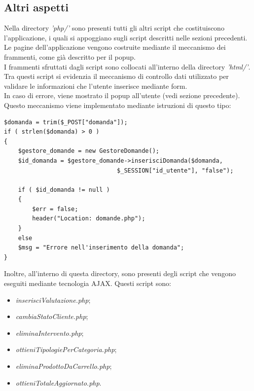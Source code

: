 \documentclass[a4paper, 14pt]{article}
\begin{document}
\begin{flushleft}
		\subsection{Altri aspetti}
			Nella directory \textit{'php/'} sono presenti tutti gli altri script che costituiscono l'applicazione,
			i quali si appoggiano sugli script descritti nelle sezioni precedenti. \\
			Le pagine dell'applicazione vengono costruite mediante il meccanismo dei frammenti, come già descritto per il popup.\\
			I frammenti sfruttati dagli script sono collocati all'interno della directory \textit{'html/'}.
			Tra questi script si evidenzia il meccanismo di controllo dati utilizzato per validare le informazioni
			che l'utente inserisce mediante form. \\
			In caso di errore, viene mostrato il popup all'utente (vedi sezione precedente).\\
			Questo meccanismo viene implementato mediante istruzioni di questo tipo: \newpage
			\begin{lstlisting}[backgroundcolor=\color{coloreSfondoGrammatiche}]
$domanda = trim($_POST["domanda"]);
if ( strlen($domanda) > 0 )
{
	$gestore_domande = new GestoreDomande();
	$id_domanda = $gestore_domande->inserisciDomanda($domanda, 
								$_SESSION["id_utente"], "false");
	
	if ( $id_domanda != null )
	{
		$err = false;
		header("Location: domande.php");
	}
	else
	$msg = "Errore nell'inserimento della domanda";
}
			\end{lstlisting}
			\medskip
			Inoltre, all'interno di questa directory, sono presenti degli script che vengono eseguiti mediante tecnologia AJAX.
			Questi script sono:
			\begin{itemize}
				\item \textit{inserisciValutazione.php};
				\item \textit{cambiaStatoCliente.php};
				\item \textit{eliminaIntervento.php};
				\item \textit{ottieniTipologiePerCategoria.php};
				\item \textit{eliminaProdottoDaCarrello.php};
				\item \textit{ottieniTotaleAggiornato.php}.
			\end{itemize}

\end{flushleft}
\end{document}
